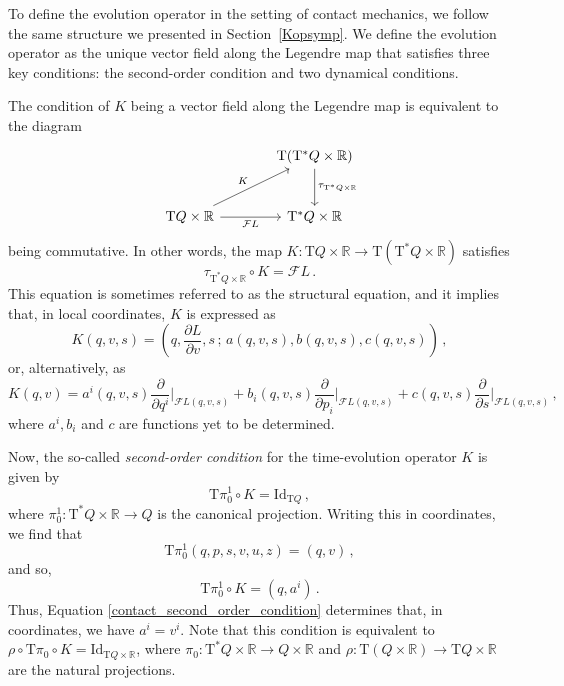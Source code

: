 \documentclass[11pt]{article}
\theoremstyle{plain}
\theoremstyle{definition}
\newcommand{\R}{\mathbb{R}}
\newcommand{\T}{{\mathrm T}}
\let\Tan\T
\newcommand{\Id}{\mathrm{Id}}
\newcommand{\parder}[2]{\frac{\partial #1}{\partial #2}}
\def\Tan{\mathrm{T}}
\def\FL{\mathcal{F} L}
\begin{document}
To define the evolution operator in the setting of contact mechanics, we follow the same structure we presented in Section~\ref{Kopsymp}.
We define the evolution operator as the unique vector field along the Legendre map that satisfies three key conditions: the second-order condition and two dynamical conditions.

The condition of $K$ being a vector field along the Legendre map is equivalent to the diagram
\[\begin{tikzcd}[column sep=large, row sep=large]
	& {\Tan (\Tan ^*Q \times \R)} \\
	{\Tan Q \times \R} & {\Tan^*Q \times \R}
	\arrow["{\tau_{\Tan^*Q \times \R}}", from=1-2, to=2-2]
	\arrow["K", from=2-1, to=1-2]
	\arrow["{\FL }"', from=2-1, to=2-2]
\end{tikzcd}\]
being commutative. In other words, the map $K\colon \Tan Q \times \R \to \Tan (\Tan^*Q \times \R)$ satisfies 
\begin{equation}
    \tau_{\Tan^*Q \times \R} \circ K = \FL \,.
\end{equation}
This equation is sometimes referred to as the structural equation, and it implies that, in local coordinates, $K$ is expressed as
\begin{equation}
    K(q,v,s)=\left( q, \parder{L}{v},s\,;\, a(q,v,s), b(q,v,s),c(q,v,s) \right) \,,
\end{equation}
or, alternatively, as
\begin{equation}
	K(q,v)=a^i(q,v,s) \frac{\partial}{\partial q^i}\bigg|_{\FL(q,v,s)} + 
	b_i(q,v,s) \frac{\partial}{\partial p_i}\bigg|_{\FL(q,v,s)} +  c(q,v,s) \frac{\partial}{\partial s}\bigg|_{\FL(q,v,s)}\,,
\end{equation}
where $a^i, b_i$ and $c$ are functions yet to be determined.

Now, the so-called \textsl{second-order condition} for the time-evolution operator $K$ is given by
\begin{equation} \label{contact_second_order_condition}
    \Tan \pi_0^1 \circ K = \mathrm{Id}_{\Tan Q} \,, 
\end{equation}
where $\pi_0^1 \colon \Tan^*Q \times \R \to Q$ is the canonical projection. Writing this in coordinates, we find that 
\begin{equation}
    \Tan\pi_0^1 (q,p,s,v,u,z) = (q,v) \,,
\end{equation}
and so, 
\begin{equation}
    \Tan \pi_0^1 \circ K = (q,a^i) \,.
\end{equation}
Thus, Equation \eqref{contact_second_order_condition} determines that, in coordinates, we have $a^i = v^i$.
Note that this condition is equivalent to $\rho\circ \Tan \pi_0 \circ K = \Id_{\Tan Q \times \R}$, where $\pi_0 \colon \Tan^*Q \times \R \to Q\times \R$ and $\rho \colon \T (Q \times \R) \to \Tan Q \times \R$ are the natural projections.
\end{document}
